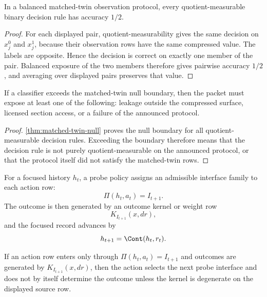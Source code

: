 \begin{theorem}
\label{thm:matched-twin-null}
In a balanced matched-twin observation protocol, every quotient-measurable
binary decision rule has accuracy $1/2$.
\end{theorem}

\begin{proof}
For each displayed pair, quotient-measurability gives the same decision
on $x_j^0$ and $x_j^1$, because their observation rows have the same
compressed value. The labels are opposite. Hence the decision is correct
on exactly one member of the pair. Balanced exposure of the two members
therefore gives pairwise accuracy $1/2$, and averaging over displayed
pairs preserves that value.
\end{proof}

\begin{corollary}
\label{cor:above-null-performance-extra-row}
If a classifier exceeds the matched-twin null boundary, then the packet
must expose at least one of the following: leakage outside the compressed
surface, licensed section access, or a failure of the announced protocol.
\end{corollary}

\begin{proof}
\autoref{thm:matched-twin-null} proves the null boundary for all
quotient-measurable decision rules. Exceeding the boundary therefore
means that the decision rule is not purely quotient-measurable on the
announced protocol, or that the protocol itself did not satisfy the
matched-twin rows.
\end{proof}

\begin{definition}
\label{def:probe-selection-outcome-row}
For a focused history $h_t$, a probe policy assigns an admissible
interface family to each action row:
$$
\Pi(h_t,a_t)=I_{t+1}.
$$
The outcome is then generated by an outcome kernel or weight row
$$
K_{I_{t+1}}(x,dr),
$$
and the focused record advances by
$$
h_{t+1}=\Cont(h_t,r_t).
$$
\end{definition}

\begin{theorem}
\label{thm:action-selects-interface-not-outcome}
If an action row enters only through $\Pi(h_t,a_t)=I_{t+1}$ and outcomes
are generated by $K_{I_{t+1}}(x,dr)$, then the action selects the next
probe interface and does not by itself determine the outcome unless the
kernel is degenerate on the displayed source row.
\end{theorem}

